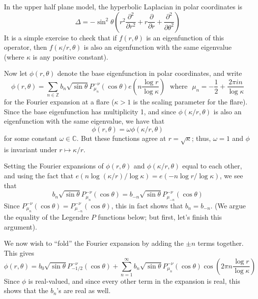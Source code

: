\documentclass[]{article}
\begin{document}
In the upper half plane model, the hyperbolic Laplacian in polar coordinates is
$$
\Delta = -\sin^2\theta\left(r^2\frac{\partial^2}{\partial r^2} + r\frac{\partial}{\partial r} + \frac{\partial^2}{\partial\theta^2}\right)
$$
It is a simple exercise to check that if $f(r, \theta)$ is an eigenfunction of this operator, then $f(\kappa/r, \theta)$ is also an eigenfunction with the same eigenvalue (where $\kappa$ is any positive constant).

Now let $\phi(r, \theta)$ denote the base eigenfunction in polar coordinates, and write
$$
\phi(r, \theta) = \sum_{n \in \mathbb{Z}}b_n\sqrt{\sin\theta}P^{-\nu}_{\mu_n}(\cos\theta)e\left( n\frac{\log r}{\log\kappa} \right) ~~~\text{where}~~~ \mu_n = -\frac{1}{2} + \frac{2\pi in}{\log \kappa}
$$
for the Fourier expansion at a flare ($\kappa > 1$ is the scaling parameter for the flare).
Since the base eigenfunction has multiplicity 1, and since $\phi(\kappa/r, \theta)$ is also an eigenfunction with the same eigenvalue, we have that
$$
\phi(r, \theta) = \omega\phi(\kappa/r, \theta)
$$
for some constant $\omega \in \mathbb{C}$.
But these functions agree at $r = \sqrt{\kappa}$; thus, $\omega = 1$ and $\phi$ is invariant under $r \mapsto \kappa/r$.

Setting the Fourier expansions of $\phi(r, \theta)$ and $\phi(\kappa/r, \theta)$ equal to each other, and using the fact that $e(n\log(\kappa/r)/\log\kappa) = e(-n\log r/\log\kappa)$, we see that
$$
b_n\sqrt{\sin\theta}P_{\mu_n}^{-\nu}(\cos\theta) = b_{-n}\sqrt{\sin\theta}P_{\mu_{-n}}^{-\nu}(\cos\theta)
$$
Since $P_{\mu_{n}}^{-\nu}(\cos\theta) = P_{\mu_{-n}}^{-\nu}(\cos\theta)$, this in fact shows that $b_n = b_{-n}$.
(We argue the equality of the Legendre $P$ functions below; but first, let's finish this argument).

We now wish to ``fold'' the Fourier expansion by adding the $\pm n$ terms together.
This gives
$$
\phi(r, \theta) = b_0\sqrt{\sin\theta}P_{-1/2}^{-\nu}(\cos\theta) +
\sum_{n=1}^{\infty}b_n\sqrt{\sin\theta}P_{\mu_{n}}^{-\nu}(\cos\theta)\cos\left( 2\pi n\frac{\log r}{\log\kappa} \right)
$$
Since $\phi$ is real-valued, and since every other term in the expansion is real, this shows that the $b_n$'s are real as well.
\\
\end{document}
